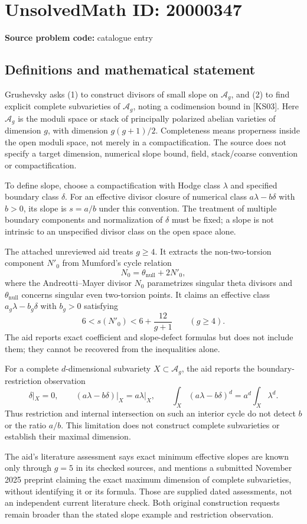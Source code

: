 \documentclass[11pt]{article}
\begin{document}
\section*{UnsolvedMath ID: 20000347}
\textbf{Source problem code:} catalogue entry
\subsection{Definitions and mathematical statement}
Grushevsky asks (1) to construct divisors of small slope on $\mathcal A_g$, and (2) to find explicit complete subvarieties of $\mathcal A_g$, noting a codimension bound in [KS03]. Here $\mathcal A_g$ is the moduli space or stack of principally polarized abelian varieties of dimension $g$, with dimension $g(g+1)/2$. Completeness means properness inside the open moduli space, not merely in a compactification. The source does not specify a target dimension, numerical slope bound, field, stack/coarse convention or compactification.

To define slope, choose a compactification with Hodge class $\lambda$ and specified boundary class $\delta$. For an effective divisor closure of numerical class $a\lambda-b\delta$ with $b>0$, its slope is $s=a/b$ under this convention. The treatment of multiple boundary components and normalization of $\delta$ must be fixed; a slope is not intrinsic to an unspecified divisor class on the open space alone.

The attached unreviewed aid treats $g\ge4$. It extracts the non-two-torsion component $N'_0$ from Mumford's cycle relation
\[
N_0=\theta_{\mathrm{null}}+2N'_0,
\]
where the Andreotti--Mayer divisor $N_0$ parametrizes singular theta divisors and $\theta_{\mathrm{null}}$ concerns singular even two-torsion points. It claims an effective class $a_g\lambda-b_g\delta$ with $b_g>0$ satisfying
\[
6<s(N'_0)<6+\frac{12}{g+1}\qquad(g\ge4).
\]
The aid reports exact coefficient and slope-defect formulas but does not include them; they cannot be recovered from the inequalities alone.

For a complete $d$-dimensional subvariety $X\subset\mathcal A_g$, the aid reports the boundary-restriction observation
\[
\delta|_X=0,\qquad
(a\lambda-b\delta)|_X=a\lambda|_X,\qquad
\int_X(a\lambda-b\delta)^d=a^d\int_X\lambda^d.
\]
Thus restriction and internal intersection on such an interior cycle do not detect $b$ or the ratio $a/b$. This limitation does not construct complete subvarieties or establish their maximal dimension.

The aid's literature assessment says exact minimum effective slopes are known only through $g=5$ in its checked sources, and mentions a submitted November 2025 preprint claiming the exact maximum dimension of complete subvarieties, without identifying it or its formula. Those are supplied dated assessments, not an independent current literature check. Both original construction requests remain broader than the stated slope example and restriction observation.
\end{document}
